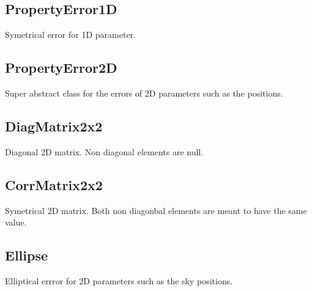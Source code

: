   \subsection{PropertyError1D}
  \label{sect:ErrorTypes.PropertyError1D}
  Symetrical error for 1D parameter.

  \subsection{PropertyError2D}
  \label{sect:ErrorTypes.PropertyError2D}
  Super abstract class for the errors of 2D parameters such as the positions.

  \subsection{DiagMatrix2x2}
  \label{sect:ErrorTypes.DiagMatrix2x2}
  Diagonal 2D matrix. Non diagonal elements are null.

  \subsection{CorrMatrix2x2}
  \label{sect:ErrorTypes.CorrMatrix2x2}
  Symetrical 2D matrix. Both non diagonbal elements are meant to have the same value.

  \subsection{Ellipse}
  \label{sect:ErrorTypes.Ellipse}
  Elliptical errror for 2D parameters such as the sky positions.

